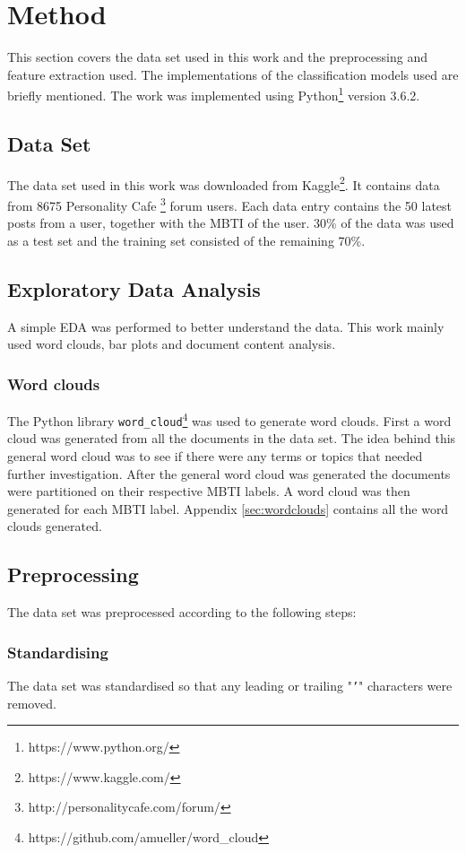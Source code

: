 \section{Method} \label{sec:method}

This section covers the data set used in this work and the preprocessing and feature extraction used.
The implementations of the classification models used are briefly mentioned.
The work was implemented using Python\footnote{https://www.python.org/} version 3.6.2.
\subsection{Data Set}
The data set used in this work was downloaded from Kaggle\footnote{https://www.kaggle.com/}.
It contains data from 8675 Personality Cafe \footnote{http://personalitycafe.com/forum/} forum users.
Each data entry contains the 50 latest posts from a user, together with the MBTI of the user.
30\% of the data was used as a test set and the training set consisted of the remaining 70\%.
\subsection{Exploratory Data Analysis}
A simple EDA was performed to better understand the data.
This work mainly used word clouds, bar plots and document content analysis.

\subsubsection{Word clouds}
The Python library \texttt{word\_cloud}\footnote{https://github.com/amueller/word\_cloud} was used to generate word clouds.
First a word cloud was generated from all the documents in the data set.
The idea behind this general word cloud was to see if there were any terms or topics that needed further investigation.
After the general word cloud was generated the documents were partitioned on their respective MBTI labels.
A word cloud was then generated for each MBTI label.
Appendix \ref{sec:wordclouds} contains all the word clouds generated.

\subsection{Preprocessing} \label{sec:method-preprocessing} 
The data set was preprocessed according to the following steps:

\subsubsection{Standardising}
The data set was standardised so that any leading or trailing "\texttt{'}" characters were removed.

